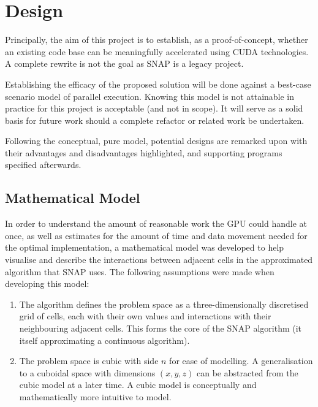 \documentclass[conference]{IEEEtran}
\begin{document}

\section{Design}
\label{sec:design}

Principally, the aim of this project is to establish, as a proof-of-concept, whether an existing code base can be meaningfully accelerated using CUDA technologies. A complete rewrite is not the goal as SNAP is a legacy project.

Establishing the efficacy of the proposed solution will be done against a best-case scenario model of parallel execution. Knowing this model is not attainable in practice for this project is acceptable (and not in scope). It will serve as a solid basis for future work should a complete refactor or related work be undertaken.

Following the conceptual, pure model, potential designs are remarked upon with their advantages and disadvantages highlighted, and supporting programs specified afterwards.


\subsection{Mathematical Model}

In order to understand the amount of reasonable work the GPU could handle at once, as well as estimates for the amount of time and data movement needed for the optimal implementation, a mathematical model was developed to help visualise and describe the interactions between adjacent cells in the approximated algorithm that SNAP uses. The following assumptions were made when developing this model:

\begin{enumerate}

\item The algorithm defines the problem space as a three-dimensionally discretised grid of cells, each with their own values and interactions with their neighbouring adjacent cells. This forms the core of the SNAP algorithm (it itself approximating a continuous algorithm).

\item The problem space is cubic with side $ n $ for ease of modelling. A generalisation to a cuboidal space with dimensions $ (x, y, z) $ can be abstracted from the cubic model at a later time. A cubic model is conceptually and mathematically more intuitive to model.

\end{enumerate}
\end{document}
